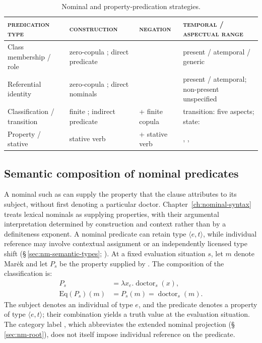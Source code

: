 \begin{table}[ht]
  \footnotesize
  \caption{Nominal and property-predication strategies.}\label{tab:copula-overview}
  \begin{tabularx}{\textwidth}{L L L L}
    \toprule
    \textsc{predication type} & \textsc{construction} &
    \textsc{negation} & \textsc{temporal / aspectual range} \\
    \midrule
    Class membership / role & zero-copula ; direct predicate &
       & present / atemporal / generic \\
    Referential identity & zero-copula ; direct nominals &
       & present / atemporal; non-present unspecified \\
    Classification / transition & finite ; indirect predicate &
       + finite copula & transition: five aspects; state: \Ret{} \\
    Property / stative & stative verb &
       + stative verb & \Cont{}, \Ret{}, \Ctpl{} \\
    \bottomrule
  \end{tabularx}
\end{table}

\subsection{Semantic composition of nominal predicates}
\label{sec:nominal-predicate-semantics}

A nominal such as  can supply the property that the clause
attributes to its subject, without first denoting a particular doctor.
Chapter~\ref{ch:nominal-syntax} treats lexical nominals as supplying
properties, with their argumental interpretation determined by construction
and context rather than by a definiteness exponent. A nominal predicate
can retain type \(\langle e,t\rangle\), while individual reference may
involve contextual assignment or an independently licensed type shift
(§\,\ref{sec:nm-semantic-types}; \cite[§3.2]{coppockbeaver2015}). At a
fixed evaluation situation \(s\), let \(m\) denote Marėk and let
\(P_s\) be the property supplied by . The composition of
the classification is:
\[
\begin{aligned}
 P_s&=\lambda x_e.\operatorname{doctor}_s(x),\\
 \mathrm{Eq}(P_s)(m)&=P_s(m)=\operatorname{doctor}_s(m).
\end{aligned}
\]
The subject denotes an individual of type \(e\), and the predicate denotes
a property of type \(\langle e,t\rangle\); their combination yields a
truth value at the evaluation situation. The category label ,
which abbreviates the extended nominal projection (§\,\ref{sec:nm-root}),
does not itself impose individual reference on the predicate.

